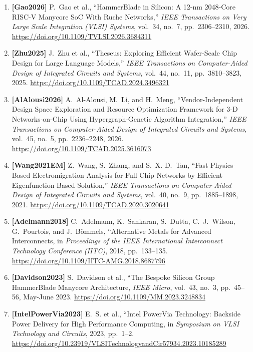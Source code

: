 \begin{enumerate}
    \item \textbf{[Gao2026]} P.~Gao et al., ``HammerBlade in Silicon: A 12-nm 2048-Core RISC-V Manycore SoC With Ruche Networks,'' \emph{IEEE Transactions on Very Large Scale Integration (VLSI) Systems}, vol.~34, no.~7, pp.~2306--2310, 2026. \url{https://doi.org/10.1109/TVLSI.2026.3684311}
    \item \textbf{[Zhu2025]} J.~Zhu et al., ``Theseus: Exploring Efficient Wafer-Scale Chip Design for Large Language Models,'' \emph{IEEE Transactions on Computer-Aided Design of Integrated Circuits and Systems}, vol.~44, no.~11, pp.~3810--3823, 2025. \url{https://doi.org/10.1109/TCAD.2024.3496321}
    \item \textbf{[AlAlousi2026]} A.~Al-Alousi, M.~Li, and H.~Meng, ``Vendor-Independent Design Space Exploration and Resource Optimization Framework for 3-D Networks-on-Chip Using Hypergraph-Genetic Algorithm Integration,'' \emph{IEEE Transactions on Computer-Aided Design of Integrated Circuits and Systems}, vol.~45, no.~5, pp.~2236--2248, 2026. \url{https://doi.org/10.1109/TCAD.2025.3616073}
    \item \textbf{[Wang2021EM]} Z.~Wang, S.~Zhang, and S.~X.-D.~Tan, ``Fast Physics-Based Electromigration Analysis for Full-Chip Networks by Efficient Eigenfunction-Based Solution,'' \emph{IEEE Transactions on Computer-Aided Design of Integrated Circuits and Systems}, vol.~40, no.~9, pp.~1885--1898, 2021. \url{https://doi.org/10.1109/TCAD.2020.3020641}

    \item \textbf{[Adelmann2018]} C.~Adelmann, K.~Sankaran, S.~Dutta, C.~J.~Wilson, G.~Pourtois, and J.~B{\"o}mmels, ``Alternative Metals for Advanced Interconnects, in \emph{Proceedings of the IEEE International Interconnect Technology Conference (IITC)}, 2018, pp.~133--135. \url{https://doi.org/10.1109/IITC-AMG.2018.8687796}
    \item \textbf{[Davidson2023]} S.~Davidson et al., ``The Bespoke Silicon Group HammerBlade Manycore Architecture, \emph{IEEE Micro}, vol.~43, no.~3, pp.~45--56, May-June 2023. \url{https://doi.org/10.1109/MM.2023.3248834}
    \item \textbf{[IntelPowerVia2023]} E.~S. et al., ``Intel PowerVia Technology: Backside Power Delivery for High Performance Computing, in \emph{Symposium on VLSI Technology and Circuits}, 2023, pp.~1--2. \url{https://doi.org/10.23919/VLSITechnologyandCir57934.2023.10185289}
\end{enumerate}

